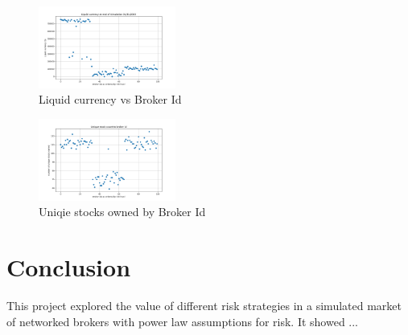 \documentclass[letterpaper, 10 pt, proceedings]{ieeetran}
\begin{document}
	\begin{figure}[h]
		\centering
		\includegraphics[width=0.4\textwidth]{liquidCurrency.png}
		\caption{Liquid currency vs Broker Id}
		\label{liquidvID}
	\end{figure}
	\FloatBarrier	

	\begin{figure}[h]
		\centering
		\includegraphics[width=0.4\textwidth]{uniqueStockCountToBrokerIds.png}
		\caption{Uniqie stocks owned by Broker Id}
		\label{uniquevID}
	\end{figure}
	\FloatBarrier

	
	
	
	
	
	\section{Conclusion}\label{sec:conclusion}
	This project explored the value of different risk strategies in a simulated market of networked brokers with power law assumptions for risk. It showed ...
	
\end{document}
